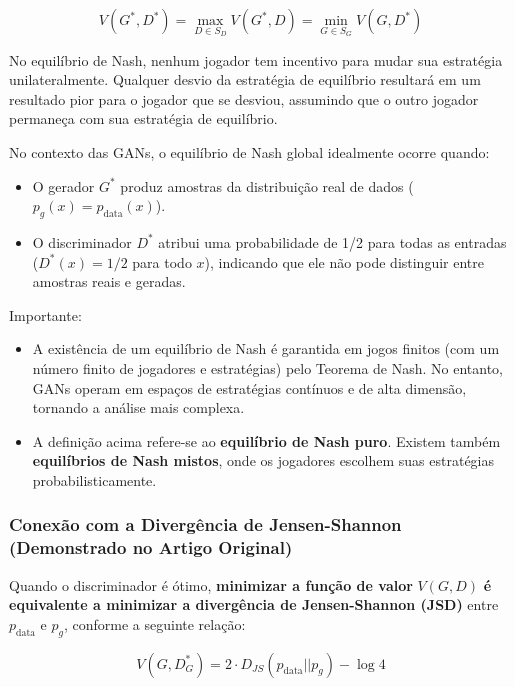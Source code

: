 \documentclass{article}
\begin{document}
\begin{equation}
V(G^*, D^*) = \max_{D \in S_D} V(G^*, D) = \min_{G \in S_G} V(G, D^*)
\end{equation}

No equilíbrio de Nash, nenhum jogador tem incentivo para mudar sua estratégia unilateralmente. Qualquer desvio da estratégia de equilíbrio resultará em um resultado pior para o jogador que se desviou, assumindo que o outro jogador permaneça com sua estratégia de equilíbrio.


No contexto das GANs, o equilíbrio de Nash global idealmente ocorre quando:

\begin{itemize}
    \item O gerador $G^*$ produz amostras da distribuição real de dados ($p_g(x) = p_{\text{data}}(x)$).
    \item O discriminador $D^*$ atribui uma probabilidade de 1/2 para todas as entradas ($D^*(x) = 1/2$ para todo $x$), indicando que ele não pode distinguir entre amostras reais e geradas.
\end{itemize} 

Importante:

\begin{itemize}
    \item A existência de um equilíbrio de Nash é garantida em jogos finitos (com um número finito de jogadores e estratégias) pelo Teorema de Nash. No entanto, GANs operam em espaços de estratégias contínuos e de alta dimensão, tornando a análise mais complexa.
    \item A definição acima refere-se ao \textbf{equilíbrio de Nash puro}. Existem também \textbf{equilíbrios de Nash mistos}, onde os jogadores escolhem suas estratégias probabilisticamente.
\end{itemize}
\subsubsection{Conexão com a Divergência de Jensen-Shannon (Demonstrado no Artigo Original)}

Quando o discriminador é ótimo, \textbf{minimizar a função de valor} $V(G, D)$ \textbf{é equivalente a minimizar a divergência de Jensen-Shannon (JSD)} entre $p_{\text{data}}$ e $p_g$, conforme a seguinte relação:

\begin{equation}
V(G, D^*_G) = 2 \cdot D_{JS}(p_{\text{data}} || p_g) - \log 4
\end{equation}
\end{document}
